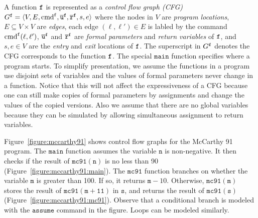 A function $\mathtt{{f}}$ is represented as a \emph{control flow graph
  (CFG)} $G^{\mathtt{{f}}} = \langle V, E, \textmd{cmd}^{\mathtt{{f}}},
\overline{\mathtt{u}}^{\mathtt{{f}}}, \overline{\mathtt{r}}^{\mathtt{{f}}}, s,
e \rangle$ where the nodes in $V$ are \emph{program locations}, $E
\subseteq V \times V$ are \emph{edges}, each edge $(\ell, \ell') \in
E$ is labled by the command $\textmd{cmd}^{\mathtt{{f}}} (\ell, \ell')$, $\overline{\mathtt{u}}^{\mathtt{{f}}}$ and $\overline{\mathtt{r}}^{\mathtt{{f}}}$ are \emph{formal parameters} and \emph{return variables} of $\mathtt{{f}}$, and $s,  e \in V$ are the \emph{entry} and \emph{exit} locations of $\mathtt{{f}}$. The superscript in $G^{\mathtt{{f}}}$ denotes the CFG corresponds to the function $\mathtt{{f}}$.
The special $\mathtt{main}$ function specifies where a program starts.
To simplify presentation, we assume the functions in a program use disjoint sets of variables and the values of formal parameters never change in a function. Notice that this will not affect the expressiveness of a CFG because one can still make copies of formal parameters by assignments and change the values of the copied versions. Also we assume that there are no global variables because they can be simulated by allowing simultaneous assignment to return variables. 

Figure~\ref{figure:mccarthy91} shows control flow graphs for the
McCarthy 91 program. The $\mathtt{main}$ function assumes the
variable $\mathtt{n}$ is non-negative. It then checks if the result
of $\mathtt{mc91(n)}$ is no less than 90
(Figure~\ref{figure:mccarthy91:main}). The $\mathtt{mc91}$ function
branches on whether the variable $\mathtt{m}$ is greater than 100. If
so, it returns $\mathtt{m} - 10$. Otherwise, 
$\mathtt{mc91(m)}$ stores the result of $\mathtt{mc91(m + 11)}$
in $\mathtt{s}$, and returns the result of $\mathtt{mc91(s)}$
(Figure~\ref{figure:mccarthy91:mc91}). Observe that a conditional
branch is modeled with the $\mathtt{assume}$ command in the
figure. Loops can be modeled similarly.

